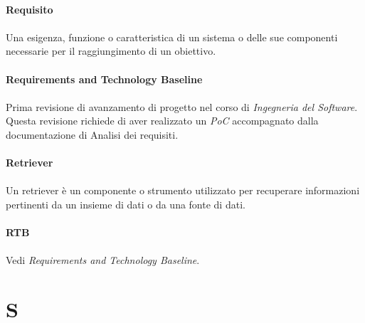 \documentclass[10pt, a4paper]{article}
\begin{document}
\vspace{2em}
\paragraph{Requisito}\noindent\hrulefill
\paragraph{}Una esigenza, funzione o caratteristica di un sistema o delle sue componenti necessarie per il raggiungimento di un obiettivo. 


\vspace{2em}
\paragraph{Requirements and Technology Baseline}\noindent\hrulefill
\paragraph{}Prima revisione di avanzamento di progetto nel corso di \textit{Ingegneria del Software\pg}. Questa revisione richiede di aver realizzato un \textit{PoC\pg} accompagnato dalla documentazione di Analisi dei requisiti.

\vspace{2em}
\paragraph{Retriever}\noindent\hrulefill
\paragraph{}Un retriever è un componente o strumento utilizzato per recuperare informazioni pertinenti da un insieme di dati o da una fonte di dati.


\vspace{2em}
\paragraph{RTB}\noindent\hrulefill 
\paragraph{}Vedi \textit{Requirements and Technology Baseline\pg}.


\newpage
\section{S}
\end{document}
